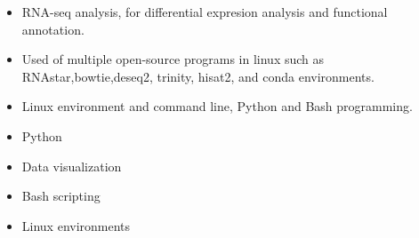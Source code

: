 \documentclass[10pt,a4paper,ragged2e]{altacv}
\begin{document}
\divider

\begin{itemize}
\item RNA-seq analysis, for differential expresion analysis and functional annotation.
\item Used of multiple open-source programs in linux such as RNAstar,bowtie,deseq2, trinity, hisat2, and conda environments.
\item Linux environment and command line, Python and Bash programming.

\divider
\end{itemize}


\begin{itemize}
\item Python
\item Data visualization
\item Bash scripting
\item Linux environments
\end{itemize}
\divider



\end{document}
